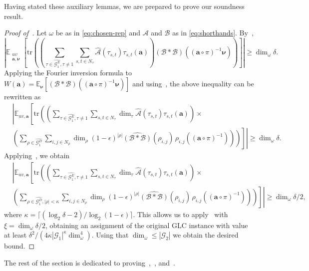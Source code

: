 \documentclass[a4paper,11pt]{article}
\theoremstyle{definition}
\newcommand{\tuple}[1]{{\mathbf{#1}}}
\newcommand{\ex}[1]{\mathbb{E}_{#1}}
\newcommand{\gr}{\mathscr{G}}
\newcommand{\ba}{\mathbf{a}}
\newcommand{\tr}{\mathrm{tr}}
\newcommand{\A}{\mathcal{A}}
\newcommand{\B}{\mathcal{B}}
\begin{document}
Having stated these auxiliary lemmas, we are prepared to prove our soundness result. 

\begin{proof}[Proof of~]
Let $\omega$ be as in \eqref{eq:chosen-rep} and $\A$ and $\B$ as in \eqref{eq:shorthands}. By~, 
\[
\left| \ex{\substack{uv \\ \tuple{a}, \bm{\nu}}}\left[
\tr\left(
\left(
\sum_{\tau\in \widehat{\gr_1^E}, \tau\neq 1}
\sum_{s,t\in N_\tau}
\widehat{\A}(\tau_{s,t}) \tau_{s,t}(\tuple{a}) \right)(\B*\B)((\ba\circ\pi)^{-1} \bm{\nu}) \right) \right] \right| \geq  \dim_\omega \delta.  \]
Applying the Fourier inversion formula to $W(\tuple{a})= \ex{\bm{\nu}}[(\B*\B)((\ba\circ\pi)^{-1}\bm{\nu})]$ and using~, the above inequality can be rewritten as
\begin{align*}&
     \left| \ex{uv,\ba}\left[ \tr \left(
    \left( \sum_{\tau\in \widehat{\gr_1^E}, \tau\neq 1}
    \sum_{
s,t\in N_\tau
}
\dim_\tau
\widehat{\A}(\tau_{s,t}) \tau_{s,t}(\tuple{a}) \right) \right.\right.\right. \times &\\ &  
\left.\left.\left.
\left(\sum_{\rho\in \widehat{\gr_1^D}}
\sum_{i,j\in N_\rho} \dim_\rho (1-\epsilon)^{|\rho|} \widehat{(\B*\B)}(\rho_{i,j}) \,
\rho_{i,j}((\ba\circ\pi)^{-1})
\right) \right)\right]\right|\geq \dim_\omega \delta.&    \end{align*}
Applying~, we obtain
    \begin{align*}&
     \left| \ex{uv,\ba}\left[ \tr \left(
    \left( \sum_{\tau\in \widehat{\gr_1^E}, \tau\neq 1}
    \sum_{
s,t\in N_\tau
}
\dim_\tau
\widehat{\A}(\tau_{s,t}) \tau_{s,t}(\tuple{a}) \right) \right.\right.\right. \times &\\ &  
\left.\left.\left.
\left(\sum_{\rho\in \widehat{\gr_1^D}, |\rho| < \kappa}
\sum_{i,j\in N_\rho} \dim_\rho (1-\epsilon)^{|\rho|} \widehat{(\B*\B)}(\rho_{i,j}) \,
\rho_{i,j}((\ba\circ\pi)^{-1})
\right) \right)\right]\right|\geq \dim_\omega \delta / 2,&    \end{align*}
where $\kappa=\lceil(\log_2 \delta - 2)/\log_2(1-\epsilon) \rceil$. 
This allows us to apply~ with $\xi = \dim_\omega \delta /2$, obtaining an assignment of the original GLC instance with value at least
$\delta^2/(4\kappa|\gr_1|^\kappa \dim_\omega^4)$. Using that $\dim_\omega\leq |\gr_2|$ we obtain the desired bound.
\end{proof}

The rest of the section is dedicated to proving~,~, and~.
\end{document}
